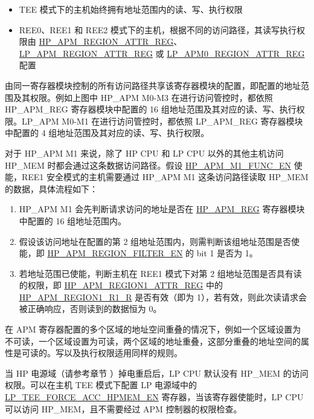 \documentclass[main\_\_CN.tex]{subfiles}
\begin{document}
\begin{itemize}

    \item TEE 模式下的主机始终拥有地址范围内的读、写、执行权限
    \item REE0、REE1 和 REE2 模式下的主机，根据不同的访问路径，其读写执行权限由 \hyperref[regdesc:HPAPMREGION0ATTRREG]{HP\_APM\_REGION\_ATTR\_REG}、 \hyperref[regdesc:LPAPMREGION0ATTRREG]{LP\_APM\_REGION\_ATTR\_REG} 或  \hyperref[regdesc:LPAPM0REGION0ATTRREG]{LP\_APM0\_REGION\_ATTR\_REG} 配置

\end{itemize}

由同一寄存器模块控制的所有访问路径共享该寄存器模块的配置，即配置的地址范围及其权限。例如上图中 HP\_APM M0-M3 在进行访问管控时，都依照 HP\_APM\_REG 寄存器模块中配置的 16 组地址范围及其对应的读、写、执行权限。LP\_APM M0-M1 在进行访问管控时，都依照 LP\_APM\_REG 寄存器模块中配置的 4 组地址范围及其对应的读、写、执行权限。


对于 HP\_APM M1 来说，除了 HP CPU 和 LP CPU 以外的其他主机访问 HP\_MEM 时都会通过这条数据访问路径。假设 \hyperref[fielddesc:HPAPMM1FUNCEN]{HP\_APM\_M1\_FUNC\_EN} 使能，REE1 安全模式的主机需要通过 HP\_APM M1 这条访问路径读取 HP\_MEM 的数据，具体流程如下：


\begin{enumerate}
    \item HP\_APM M1 会先判断请求访问的地址是否在 \hyperref[sec:permctrl-reg-hp]{HP\_APM\_REG} 寄存器模块中配置的 16 组地址范围内。
    \item 假设该访问地址在配置的第 2 组地址范围内，则需判断该组地址范围是否使能，即 \hyperref[fielddesc:HPAPMREGIONFILTEREN]{HP\_APM\_REGION\_FILTER\_EN} 的 bit 1 是否为 1。
    \item 若地址范围已使能，判断主机在 REE1 模式下对第 2 组地址范围是否具有读的权限，即  \hyperref[regdesc:HPAPMREGION0ATTRREG]{HP\_APM\_REGION1\_ATTR\_REG}  中的 \hyperref[fielddesc:HPAPMREGION0R1R]{HP\_APM\_REGION1\_R1\_R} 是否有效（即为 1），若有效，则此次读请求会被正确响应，否则读到的数据恒为 0。
\end{enumerate}

在 APM 寄存器配置的多个区域的地址空间重叠的情况下，例如一个区域设置为不可读，一个区域设置为可读，两个区域的地址重叠，这部分重叠的地址空间的属性是可读的。写以及执行权限适用同样的规则。


当 HP 电源域（请参考章节 \textit{}）掉电重启后，LP CPU 默认没有 HP\_MEM 的访问权限。可以在主机 TEE 模式下配置 LP 电源域中的 \hyperref[fielddesc:LPTEEFORCEACCHPMEMEN]{LP\_TEE\_FORCE\_ACC\_HPMEM\_EN} 寄存器，当该寄存器使能时，LP CPU 可以访问 HP\_MEM，且不需要经过 APM 控制器的权限检查。
\end{document}
